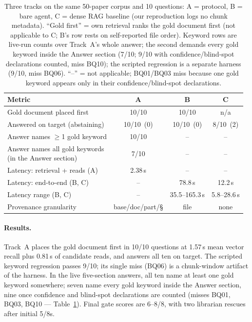 \begin{table}[t]
\centering
\caption{Three tracks on the same 50-paper corpus and 10 questions:
A = \sys{} protocol, B = bare agent, C = dense RAG baseline (our reproduction
logs no chunk metadata). ``Gold first'' = own retrieval ranks the gold document
first (not applicable to C; B's row rests on self-reported file order).
Keyword rows are live-run counts over Track~A's
whole answer; the second demands every gold keyword inside the Answer section
(7/10; 9/10 with confidence/blind-spot declarations counted, miss BQ10); the
scripted regression is a separate harness (9/10, miss BQ06). ``--'' = not
applicable; BQ01/BQ03 miss because one gold keyword appears only in their
confidence/blind-spot declarations.}
\label{tab:threeway}
\footnotesize
\setlength{\tabcolsep}{3.2pt}
\begin{tabular}{@{}lccc@{}}
\toprule
Metric & A & B & C \\
\midrule
Gold document placed first       & 10/10 & 10/10 & n/a \\
Answered on target (abstaining)  & 10/10 \,(0) & 10/10 \,(0) & 8/10 \,(2) \\
Answer names $\geq$1 gold keyword & 10/10 & --    & --  \\
\parbox[t]{4.1cm}{\raggedright Answer names all gold keywords\\(in the Answer section)} & 7/10 & -- & -- \\
Latency: retrieval + reads (A)   & 2.38\,s & -- & -- \\
Latency: end-to-end (B, C)       & --    & 78.8\,s & 12.2\,s \\
Latency range (B, C)             & --    & 35.5--165.3\,s & 5.8--28.6\,s \\
Provenance granularity           & base/doc/part/\S & file & none \\
\bottomrule
\end{tabular}
\end{table}

\paragraph{Results.}
Track~A places the gold document first in 10/10 questions at 1.57\,s mean vector
recall plus 0.81\,s of candidate reads, and answers all ten on target. The
scripted keyword regression passes 9/10; its single miss (BQ06) is a chunk-window
artifact of the harness. In the live five-section answers, all ten
name at least one gold keyword somewhere; seven name every gold keyword inside
the Answer section, nine once confidence and blind-spot declarations are
counted (misses BQ01, BQ03, BQ10 --- Table~\ref{tab:threeway}). Final gate
scores are 6--8/8, with two librarian rescues after initial 5/8s.


